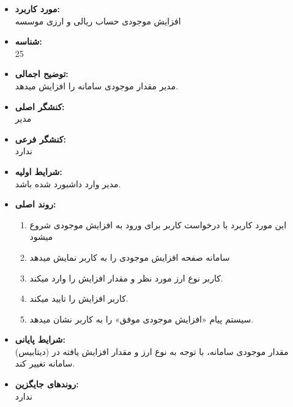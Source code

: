 \documentclass{article}
\begin{document}
\begin{itemize}
\item \textbf{مورد کاربرد:}\\
افزایش موجودی حساب ریالی و ارزی موسسه
\item \textbf{شناسه:}\\
25
\item \textbf{توضیح اجمالی:}\\
مدیر مقدار موجودی سامانه را افزایش میدهد.
\item \textbf{کنشگر اصلی:}\\
مدیر
\item \textbf{کنشگر فرعی:}\\
ندارد
\item \textbf{شرایط اولیه:}\\
مدیر وارد داشبورد شده باشد.
\item \textbf{روند اصلی:}\\
\begin{enumerate}
\item  این مورد کاربرد با درخواست کاربر برای ورود به افزایش موجودی شروع میشود
\item سامانه صفحه افزایش موجودی را به کاربر نمایش میدهد
\item کاربر نوع ارز مورد نظر و مقدار افزایش را وارد میکند.
\item کاربر افزایش را تایید میکند.
\item  سیستم پیام «افزایش موجودی موفق» را به کاربر نشان میدهد.
\end{enumerate}
\item \textbf{شرایط پایانی:}\\ 
مقدار موجودی سامانه، با توجه به نوع ارز و مقدار افزایش یافته در (دیتابیس) سامانه تغییر کند.
\item \textbf{روندهای جایگزین:}\\
ندارد
\end{itemize}
\noindent\makebox[\linewidth]{\rule{\paperwidth}{0.4pt}}
\end{document}
